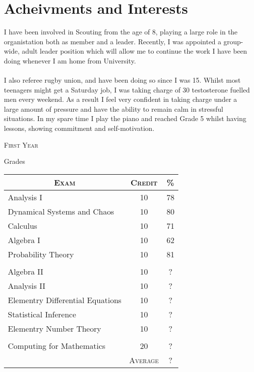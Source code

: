 \documentclass[a4paper, 11pt]{article}
\begin{document}
\section{Acheivments and Interests}
I have been involved in Scouting from the age of 8, playing a large role in the organistation both as member and a leader. Recently, I was appointed a group-wide, adult leader position which will allow me to continue the work I have been doing whenever I am home from University. \\
\\
I also referee rugby union, and have been doing so since I was 15. Whilst most teenagers might get a Saturday job, I was taking charge of 30 testosterone fuelled men every weekend. As a result I feel very confident in taking charge under a large amount of pressure and have the ability to remain calm in stressful situations. In my spare time I play the piano and reached Grade 5 whilst having lessons, showing commitment and self-motivation.

\bigskip
\par{\centering\Large {\textsc{First Year}}
\par}\large{\centering Grades\par}\normalsize

\begin{center}
\begin{tabular}{lcc}

\multicolumn{1}{c}{\textsc{Exam}} & \textsc{Credit}&\textsc{\%}\\ \hline
Analysis I & 10 & 78\\
Dynamical Systems and Chaos & 10 & 80\\
Calculus & 10 & 71\\
Algebra I & 10 & 62\\
Probability Theory & 10 & 81\\
\\
Algebra II & 10 & ?\\
Analysis II & 10 & ?\\
Elementry Differential Equations & 10 & ?\\
Statistical Inference & 10 & ?\\
Elementry Number Theory & 10 & ?\\
\\
Computing for Mathematics & 20 & ?\\
\cline{2-3}
&\textsc{Average}&?

\end{tabular}
\end{center}
\bigskip
\end{document}
